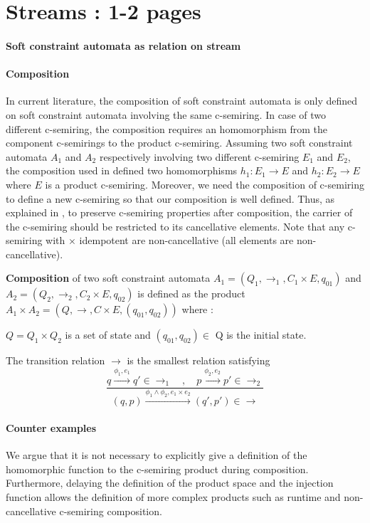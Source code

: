\section{Streams : 1-2 pages}
\paragraph{Soft constraint automata as relation on stream}

\paragraph{Composition} 
In current literature, the composition of soft constraint automata is only defined on soft constraint automata involving the same c-semiring. In case of two different c-semiring, the composition requires an homomorphism from the component c-semirings to the product c-semiring. Assuming two soft constraint automata $A_1$ and $A_2$ respectively involving two different c-semiring $E_1$ and $E_2$, the composition used in \cite{?} defined two homomorphisms $h_1 : E_1 \rightarrow E$ and $h_2 : E_2 \rightarrow E$ where $E$ is a product c-semiring. Moreover, we need the composition of c-semiring to define a new c-semiring so that our composition is well defined. Thus, as explained in \cite{?}, to preserve c-semiring properties after composition, the carrier of the c-semiring should be restricted to its cancellative elements. Note that any c-semiring with $\times$ idempotent are non-cancellative (all elements are non-cancellative).
\begin{definition}
	\textbf{Composition} of two soft constraint automata $A_1=(Q_1,\rightarrow_1, C_1 \times E, q_{01})$ and $A_2=(Q_2,\rightarrow_2, C_2\times E, q_{02})$ is defined as the product $ A_1 \times A_2 = (Q, \rightarrow, C\times E, (q_{01},q_{02}) )$ where : 
	\begin{list}{-}{ }
		\item $Q= Q_1 \times Q_2 $ is a set of state and $(q_{01},q_{02})\in$ Q is the initial state.
		\item The transition relation $\rightarrow$ is the smallest relation satisfying
		$$
		\frac{q \xrightarrow{\phi_1,e_1} q' \in \rightarrow _1 \quad , \quad p\xrightarrow{\phi_2,e_2}p' \in \rightarrow_2}{(q,p) \xrightarrow{\phi_1 \land \phi_2,e_1 \times e_2}(q',p') \in \rightarrow}
		$$
	\end{list}
\end{definition}
\paragraph{Counter examples}
We argue that it is not necessary to explicitly give a definition of the homomorphic function to the c-semiring product during composition. Furthermore, delaying the definition of the product space and the injection function allows the definition of more complex products such as runtime and non-cancellative c-semiring composition.
